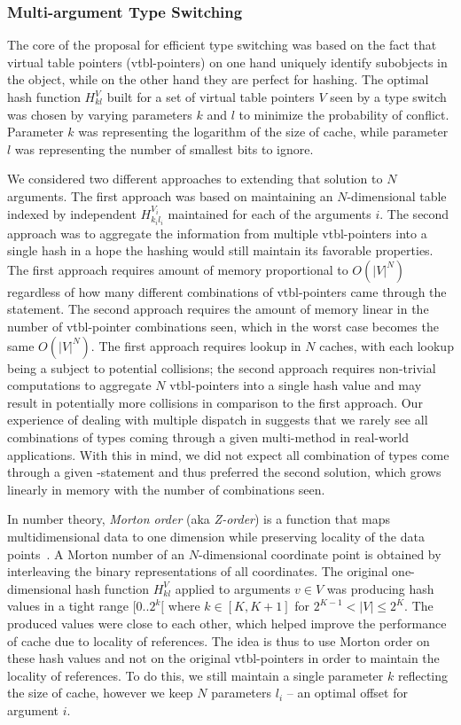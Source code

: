 \subsubsection{Multi-argument Type Switching}
\label{sec:multiarg}

The core of the proposal for efficient type switching was based on the fact that 
virtual table pointers (vtbl-pointers) on one hand uniquely identify subobjects 
in the object, while on the other hand they are perfect for hashing. The optimal 
hash function $H_{kl}^V$ built for a set of virtual table pointers $V$ seen by a 
type switch was chosen by varying parameters $k$ and $l$ to minimize the 
probability of conflict. Parameter $k$ was representing the logarithm of the 
size of cache, while parameter $l$ was representing the number of smallest bits 
to ignore.

We considered two different approaches to extending that solution to $N$ 
arguments. The first approach was based on maintaining an $N$-dimensional 
table indexed by independent $H_{k_il_i}^{V_i}$ maintained for each of the 
arguments $i$. The second approach was to aggregate the information from 
multiple vtbl-pointers into a single hash in a hope the hashing would still 
maintain its favorable properties. The first approach requires amount of memory 
proportional to $O(|V|^N)$ regardless of how many different combinations of 
vtbl-pointers came through the statement. The second approach requires the 
amount of memory linear in the number of vtbl-pointer combinations seen, which 
in the worst case becomes the same $O(|V|^N)$. The first approach requires 
lookup in $N$ caches, with each lookup being a subject to potential collisions; 
the second approach requires non-trivial computations to aggregate $N$ 
vtbl-pointers into a single hash value and may result in potentially more 
collisions in comparison to the first approach. Our experience of dealing with 
multiple dispatch in \Cpp{} suggests that we rarely see all combinations of 
types coming through a given multi-method in real-world applications. With this 
in mind, we did not expect all combination of types come through a given 
-statement and thus preferred the second solution, which grows 
linearly in memory with the number of combinations seen.

In number theory, \emph{Morton order} (aka \emph{Z-order}) is a function that 
maps multidimensional data to one dimension while preserving locality of the 
data points~\cite{Morton66}. A Morton number of an $N$-dimensional coordinate 
point is obtained by interleaving the binary representations of all coordinates.
The original one-dimensional hash function $H_{kl}^V$ applied to arguments $v \in V$ 
was producing hash values in a tight range $[0..2^k[$ where $k \in [K,K+1]$ for 
$2^{K-1} < |V| \leq 2^K$. The produced values were close to each other, which 
helped improve the performance of cache due to locality of references. The 
idea is thus to use Morton order on these hash values and not on the original 
vtbl-pointers in order to maintain the locality of references. To do this, we 
still maintain a single parameter $k$ reflecting the size of cache, however we 
keep $N$ parameters $l_i$ -- an optimal offset for argument $i$.

